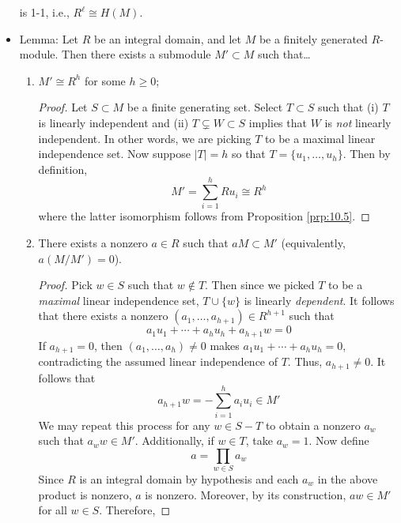 \documentclass[../notes.tex]{subfiles}
\begin{document}
\begin{itemize}
\begin{equation*}
    \end{equation*}
    is 1-1, i.e., $R^\ell\cong H(M)$.
    \item Lemma: Let $R$ be an integral domain, and let $M$ be a finitely generated $R$-module. Then there exists a submodule $M'\subset M$ such that\dots
    \begin{enumerate}[label={(\roman*)}]
        \item $M'\cong R^h$ for some $h\geq 0$;
        \begin{proof}
            Let $S\subset M$ be a finite generating set. Select $T\subset S$ such that (i) $T$ is linearly independent and (ii) $T\subsetneq W\subset S$ implies that $W$ is \emph{not} linearly independent. In other words, we are picking $T$ to be a maximal linear independence set. Now suppose $|T|=h$ so that $T=\{u_1,\dots,u_h\}$. Then by definition,
            \begin{equation*}
                M' = \sum_{i=1}^hRu_i
                \cong R^h
            \end{equation*}
            where the latter isomorphism follows from Proposition \ref{prp:10.5}.
        \end{proof}
        \item There exists a nonzero $a\in R$ such that $aM\subset M'$ (equivalently, $a(M/M')=0$).
        \begin{proof}
            Pick $w\in S$ such that $w\notin T$. Then since we picked $T$ to be a \emph{maximal} linear independence set, $T\cup\{w\}$ is linearly \emph{dependent}. It follows that there exists a nonzero $(a_1,\dots,a_{h+1})\in R^{h+1}$ such that
            \begin{equation*}
                a_1u_1+\cdots+a_hu_h+a_{h+1}w = 0
            \end{equation*}
            If $a_{h+1}=0$, then $(a_1,\dots,a_h)\neq 0$ makes $a_1u_1+\cdots+a_hu_h=0$, contradicting the assumed linear independence of $T$. Thus, $a_{h+1}\neq 0$. It follows that
            \begin{equation*}
                a_{h+1}w = -\sum_{i=1}^ha_iu_i \in M'
            \end{equation*}
            We may repeat this process for any $w\in S-T$ to obtain a nonzero $a_w$ such that $a_ww\in M'$. Additionally, if $w\in T$, take $a_w=1$. Now define
            \begin{equation*}
                a = \prod_{w\in S}a_w
            \end{equation*}
            Since $R$ is an integral domain by hypothesis and each $a_w$ in the above product is nonzero, $a$ is nonzero. Moreover, by its construction, $aw\in M'$ for all $w\in S$. Therefore,

\end{proof}
\end{enumerate}
\end{itemize}
\end{document}
